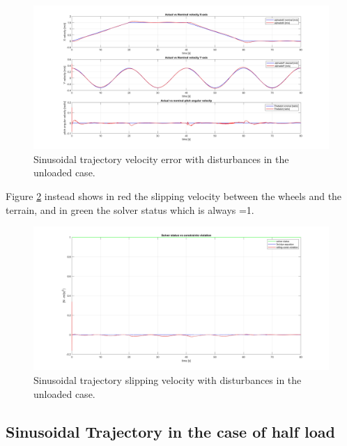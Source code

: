 \begin{figure}
    \centering
    \includegraphics[width=1\linewidth]{Images/Robustness analysis/Unloaded/sinusoidal trajectory/Velocity_error.jpg}
    \caption{Sinusoidal trajectory velocity error with disturbances in the unloaded case.}
    \label{fig:Sinusoidal trajectory velocity error with disturbances in the unloaded case}
\end{figure}

Figure \ref{fig:Sinusoidal trajectory slipping velocity with disturbances in the unloaded case} instead shows in red the slipping velocity between the wheels and the terrain, and in green the solver status which is always =1.

\begin{figure}
    \centering
    \includegraphics[width=1\linewidth]{Images/Robustness analysis/Unloaded/sinusoidal trajectory/Slipping_velocity.jpg}
    \caption{Sinusoidal trajectory slipping velocity with disturbances in the unloaded case.}
    \label{fig:Sinusoidal trajectory slipping velocity with disturbances in the unloaded case}
\end{figure}


\subsection{Sinusoidal Trajectory in the case of half load}
\label{subsec:Sinusoidal Trajectory in the case of half load}

